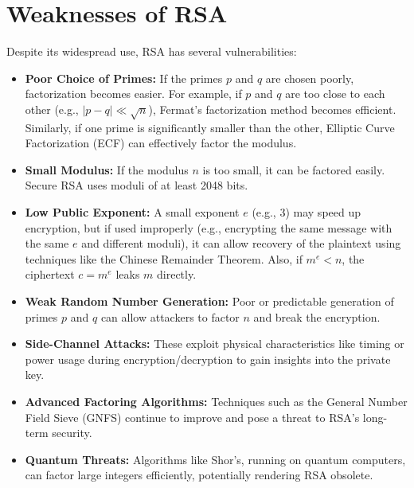 \documentclass{article}
\begin{document}
\section{Weaknesses of RSA}

\begin{warningbox}[title=Security Vulnerabilities]
    Despite its widespread use, RSA has several vulnerabilities:

    \begin{itemize}
        \item \textbf{Poor Choice of Primes:} If the primes $p$ and $q$ are chosen poorly, factorization becomes easier. For example, if $p$ and $q$ are too close to each other (e.g., $|p-q| \ll \sqrt{n}$), Fermat's factorization method becomes efficient. Similarly, if one prime is significantly smaller than the other, Elliptic Curve Factorization (ECF) can effectively factor the modulus.

        \item \textbf{Small Modulus:} If the modulus $n$ is too small, it can be factored easily. Secure RSA uses moduli of at least 2048 bits.

        \item \textbf{Low Public Exponent:} A small exponent $e$ (e.g., 3) may speed up encryption, but if used improperly (e.g., encrypting the same message with the same $e$ and different moduli), it can allow recovery of the plaintext using techniques like the Chinese Remainder Theorem. Also, if $m^e < n$, the ciphertext $c = m^e$ leaks $m$ directly.

        \item \textbf{Weak Random Number Generation:} Poor or predictable generation of primes $p$ and $q$ can allow attackers to factor $n$ and break the encryption.

        \item \textbf{Side-Channel Attacks:} These exploit physical characteristics like timing or power usage during encryption/decryption to gain insights into the private key.

        \item \textbf{Advanced Factoring Algorithms:} Techniques such as the General Number Field Sieve (GNFS) continue to improve and pose a threat to RSA's long-term security.

        \item \textbf{Quantum Threats:} Algorithms like Shor's, running on quantum computers, can factor large integers efficiently, potentially rendering RSA obsolete.
    \end{itemize}
\end{warningbox}
\end{document}
